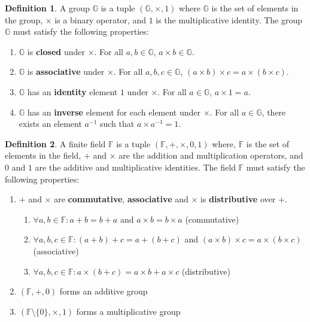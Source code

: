 \documentclass[11pt]{report}
\theoremstyle{definition}
\newtheorem{definition}{Definition}[section]
\theoremstyle{plain}
\begin{document}
\begin{definition}\label{def:group}
  A group $\mathbb{G}$ is a tuple $(\mathbb{G}, \times, 1)$ where $\mathbb{G}$ is the set of elements in the group, $\times$ is a binary operator, and $1$ is the multiplicative identity. The group $\mathbb{G}$ must satisfy the following properties:
  \begin{enumerate}
    \item $\mathbb{G}$ is \textbf{closed} under $\times$. For all $a,b \in \mathbb{G}$, $a \times b \in \mathbb{G}$.
    \item $\mathbb{G}$ is \textbf{associative} under $\times$. For all $a,b,c \in \mathbb{G}$, $(a \times b) \times c = a \times (b \times c)$.
    \item $\mathbb{G}$ has an \textbf{identity} element $1$ under $\times$. For all $a \in \mathbb{G}$, $a \times 1 = a$.
    \item $\mathbb{G}$ has an \textbf{inverse} element for each element under $\times$. For all $a \in \mathbb{G}$, there exists an element $a^{-1}$ such that $a \times a^{-1} = 1$.
  \end{enumerate}
\end{definition}

\begin{definition}\label{def:field}
  A finite field $\mathbb{F}$ is a tuple $(\mathbb{F}, +, \times, 0, 1)$ where, $\mathbb{F}$ is the set of elements in the field, $+$ and $\times$ are the addition and multiplication operators, and $0$ and $1$ are the additive and multiplicative identities. The field $\mathbb{F}$ must satisfy the following properties:
  \begin{enumerate}
    \item  $+$ and $\times$ are \textbf{commutative}, \textbf{associative} and $\times$ is \textbf{distributive} over $+$.
          \begin{enumerate}
            \item $\forall a,b \in \mathbb{F}: a + b = b + a$ and $a \times b = b \times a$ (commutative)
            \item $\forall a,b,c \in \mathbb{F}: (a + b) + c = a + (b + c)$ and $(a \times b) \times c = a \times (b \times c)$ (associative)
            \item $\forall a,b,c \in \mathbb{F}: a \times (b + c) = a \times b + a \times c$ (distributive)
          \end{enumerate}
    \item $(\mathbb{F}, +, 0)$ forms an additive group
    \item $(\mathbb{F} \setminus \{0\}, \times, 1)$ forms a multiplicative group
  \end{enumerate}
\end{definition}
\end{document}
